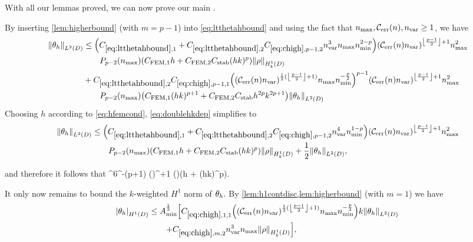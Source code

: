 \epf
With all our lemmas proved, we can now prove our main .

\label{page:thmfembound}
By inserting \cref{lem:higherbound} (with $m=p-1$) into \cref{eq:ltthetahbound} and using the fact that $\nmax, \En, \nvar \geq 1$, we have
\begin{align}
\NLtD{\thetah}&\leq \mleft(\Cfirst + \Csecond\Chighfn{p-1,2} \nvar^3\nmax\nmin^{2-p} \mright)\mleft(\En \nvar\mright)^{\floor{\frac{p-1}2}+1}\nmax^2\nonumber\\
&\quad\quad\Pfn{p-2}\mleft(\nmax\mright)\mleft(\CFEMotilde h + \CFEMttilde \CAnk (hk)^p\mright)\NHokD{\rho}\nonumber\\
&+\Csecond  \Chighfn{p-1,1} \mleft(\mleft(\En\nvar\mright)^{\half(\floor{\frac{p-1}2}+1)}\nmax\nmin^{-\frac{p}2}\mright)^{p-1}\mleft(\En \nvar\mright)^{\floor{\frac{p-1}2}+1}\nmax^2\nonumber\\
&\quad\quad\Pfn{p-2}\mleft(\nmax\mright)\mleft(\CFEMotilde (hk )^{p+1}+ \CFEMttilde \CAnk h^{2p}k^{2p+1}\mright)\NLtD{\thetah}\label{eq:doublehkdep}
\end{align}
Choosing $h$ according to \cref{eq:hfemcond}, \cref{eq:doublehkdep} simplifies to
\begin{align*}
\NLtD{\thetah} &\leq \mleft(\Cfirst + \Csecond\Chighfn{p-1,2} \nvar^4\nmin^{1-p} \mright)\mleft(\En \nvar\mright)^{\floor{\frac{p-1}2}+1}\nmax^2\\
&\quad\quad\Pfn{p-2}\mleft(\nmax\mright)\mleft(\CFEMotilde h + \CFEMttilde \CAnk (hk)^p\mright)\NHokD{\rho} + \half \NLtD{\thetah},
\end{align*}

and therefore it follows that
\beq\label{eq:ltboundwithrho}
\NLtD{\thetah} \leq \nvar^6\nmin^{-(p+1)} \mleft(\En \nvar\mright)^{+1} \mleft(\nmax\mright)\mleft(\CLtboundo h + \CLtboundt  \CAnk (hk)^p\mright)\NHokD{\rho}.
\eeq

It only now remains to bound the $k$-weighted $H^1$ norm of $\theta_{h}.$ By \cref{lem:h1contdisc,lem:higherbound} (with $m=1$) we have
\begin{align}
\SNHoD{\thetah} &\leq \Amin^{\half} \mleft[\Chighfn{1,1} \mleft(\mleft(\En\nvar\mright)^{\half(\floor{\frac{p-1}2}+1)}\nmax\nmin^{-\frac{p}2}\mright)k \NLtD{\thetah}\mright.\nonumber\\
&\mleft.\quad\quad+ \Chighmt \nvar^3\nmax \NHokD{\rho}\mright],\label{eq:sntheta}
\end{align}

